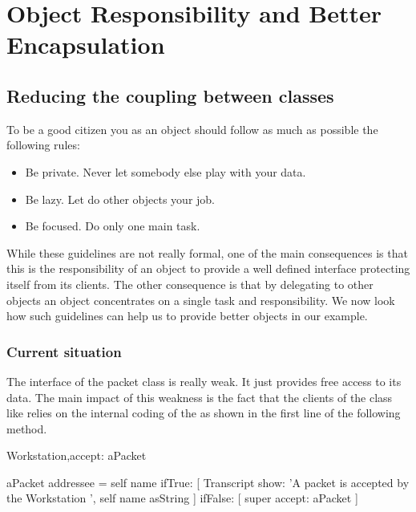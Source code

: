 
\ifx\wholebook\relax\else


\fi

\chapter{ Object Responsibility and Better Encapsulation}





\section{Reducing the coupling between classes }
To be a good citizen you as an object should follow as much as 
possible the following rules:

\begin{itemize}
\item
Be private. Never let somebody else play with your data.
\item
Be lazy. Let do other objects your job.
\item
Be focused. Do only one main task. 
\end{itemize}

While these guidelines are not really formal, one of the main 
consequences is that this is the responsibility of an object 
to provide a well defined interface protecting itself from its 
clients. The other consequence is that by delegating to other 
objects an object concentrates on a single task and responsibility. 
We now look how such guidelines can help us to provide better 
objects in our example.



\subsection{Current situation}
The interface of the packet class is really weak. It just provides free access to its data. The main impact of this weakness is the fact that the clients of the class  like  relies  on the internal coding of the  as shown in the first line 
of the following method.

\begin{scode}
 Workstation\sep{}accept: aPacket

    aPacket addressee = self name
       ifTrue: [  Transcript show: 'A packet is accepted by the Workstation ', self name asString ] 
       ifFalse:  [ super accept: aPacket ] 
\end{scode}


